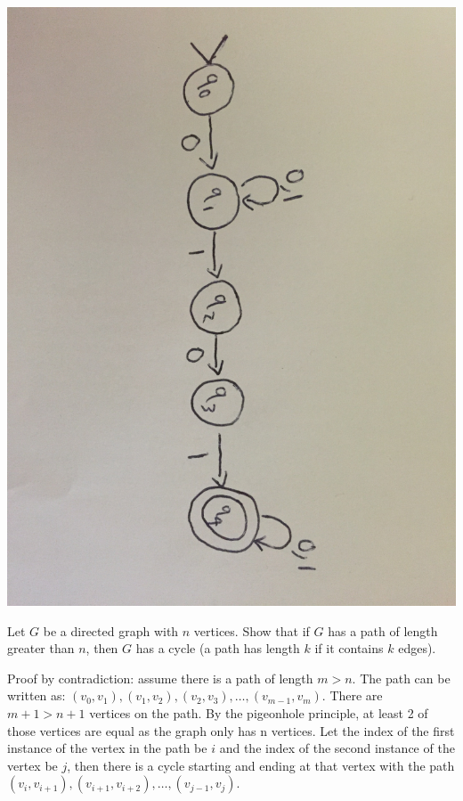 \documentclass[solution, letterpaper]{cs20exam}
\begin{document}
\begin{solution}
\includegraphics[width=15cm]{midterm2statesolution}
\end{solution}



\problem{}{}

Let $G$ be a directed graph with $n$ vertices. Show that if $G$ has a path of length greater than $n$, then $G$ has a cycle (a path has length $k$ if it contains $k$ edges).

\begin{solution}

Proof by contradiction: assume there is a path of length $m > n$. The path can be written as: $(v_0, v_1), (v_1, v_2), (v_2, v_3), \ldots, (v_{m-1}, v_m)$. There are $m + 1 > n + 1$ vertices on the path. By the pigeonhole principle, at least 2 of those vertices are equal as the graph only has n vertices. Let the index of the first instance of the vertex in the path be $i$ and the index of the second instance of the vertex be $j$, then there is a cycle starting and ending at that vertex with the path $(v_i, v_{i+1}), (v_{i+1}, v_{i+2}), \ldots, (v_{j-1}, v_{j})$.

\end{solution}
\end{document}

